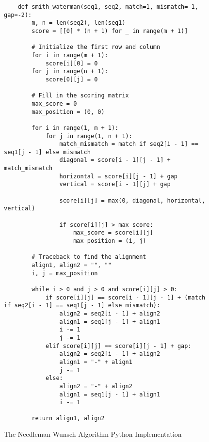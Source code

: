 \begin{figure}[H]
    \centering
    \begin{lstlisting}
    def smith_waterman(seq1, seq2, match=1, mismatch=-1, gap=-2):
        m, n = len(seq2), len(seq1)
        score = [[0] * (n + 1) for _ in range(m + 1)]
    
        # Initialize the first row and column
        for i in range(m + 1):
            score[i][0] = 0
        for j in range(n + 1):
            score[0][j] = 0
    
        # Fill in the scoring matrix
        max_score = 0
        max_position = (0, 0)
    
        for i in range(1, m + 1):
            for j in range(1, n + 1):
                match_mismatch = match if seq2[i - 1] == seq1[j - 1] else mismatch
                diagonal = score[i - 1][j - 1] + match_mismatch
                horizontal = score[i][j - 1] + gap
                vertical = score[i - 1][j] + gap
    
                score[i][j] = max(0, diagonal, horizontal, vertical)
    
                if score[i][j] > max_score:
                    max_score = score[i][j]
                    max_position = (i, j)
    
        # Traceback to find the alignment
        align1, align2 = "", ""
        i, j = max_position
    
        while i > 0 and j > 0 and score[i][j] > 0:
            if score[i][j] == score[i - 1][j - 1] + (match if seq2[i - 1] == seq1[j - 1] else mismatch):
                align2 = seq2[i - 1] + align2
                align1 = seq1[j - 1] + align1
                i -= 1
                j -= 1
            elif score[i][j] == score[i][j - 1] + gap:
                align2 = seq2[i - 1] + align2
                align1 = "-" + align1
                j -= 1
            else:
                align2 = "-" + align2
                align1 = seq1[j - 1] + align1
                i -= 1
    
        return align1, align2
    \end{lstlisting}
    \caption{The Needleman Wunsch Algorithm Python Implementation}
    \label{fig:smith-waterman}
\end{figure}

